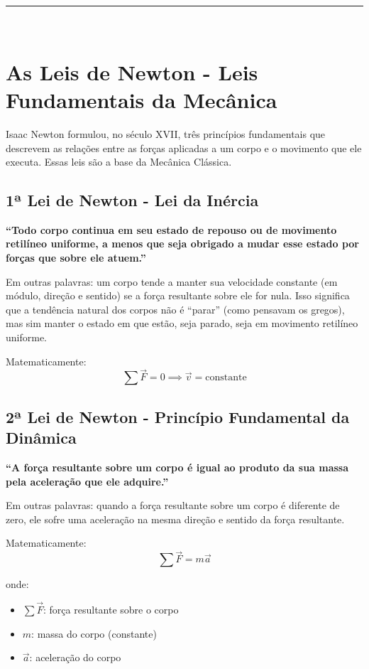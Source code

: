 \noindent\rule{\linewidth}{0.6pt}\\

\section*{As Leis de Newton - Leis Fundamentais da Mecânica}

Isaac Newton formulou, no século XVII, três princípios fundamentais que descrevem as relações entre as forças aplicadas a um corpo e o movimento que ele executa. Essas leis são a base da Mecânica Clássica.

\subsection*{1ª Lei de Newton - Lei da Inércia}

\textbf{``Todo corpo continua em seu estado de repouso ou de movimento retilíneo uniforme, a menos que seja obrigado a mudar esse estado por forças que sobre ele atuem.''}

Em outras palavras: um corpo tende a manter sua velocidade constante (em módulo, direção e sentido) se a força resultante sobre ele for nula. Isso significa que a tendência natural dos corpos não é ``parar'' (como pensavam os gregos), mas sim manter o estado em que estão, seja parado, seja em movimento retilíneo uniforme.

Matematicamente:
\[
\sum \vec{F} = 0 \implies \vec{v} = \text{constante}
\]

\subsection*{2ª Lei de Newton - Princípio Fundamental da Dinâmica}

\textbf{``A força resultante sobre um corpo é igual ao produto da sua massa pela aceleração que ele adquire.''}

Em outras palavras: quando a força resultante sobre um corpo é diferente de zero, ele sofre uma aceleração na mesma direção e sentido da força resultante.

Matematicamente:
\[
\sum \vec{F} = m \vec{a}
\]

onde:
\begin{itemize}
    \item \( \sum \vec{F} \): força resultante sobre o corpo
    \item \( m \): massa do corpo (constante)
    \item \( \vec{a} \): aceleração do corpo
\end{itemize}

